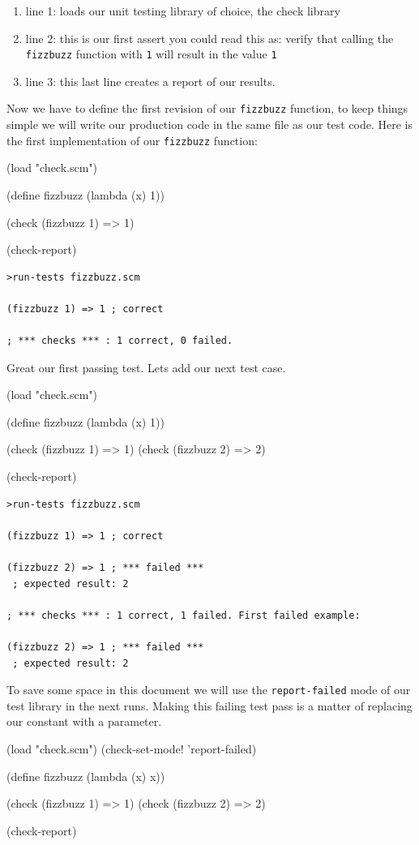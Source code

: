\documentclass[12pt,a4paper,english,twoside]{article}
\begin{document}
\begin{enumerate}
  \item line 1: loads our unit testing library of choice, the check library
  \item line 2: this is our first assert you could read this as: verify that calling 
    the \texttt{fizzbuzz} function with \texttt{1} will result in the value 
    \texttt{1}
 \item line 3: this last line creates a report of our results.
\end{enumerate}
Now we have to define the first revision of our \texttt{fizzbuzz} function, 
to keep things simple we will write our production code in the same file as 
our test code. Here is the first implementation of our \texttt{fizzbuzz} 
function:
\begin{schemecode}
(load "check.scm")

(define fizzbuzz (lambda (x) 1))

(check (fizzbuzz 1) => 1)

(check-report)
\end{schemecode}
\begin{lstlisting}
>run-tests fizzbuzz.scm

(fizzbuzz 1) => 1 ; correct

; *** checks *** : 1 correct, 0 failed.
\end{lstlisting}
Great our first passing test. Lets add our next test case.  
\begin{schemecode}
(load "check.scm")

(define fizzbuzz (lambda (x) 1))

(check (fizzbuzz 1) => 1)
(check (fizzbuzz 2) => 2)

(check-report)
\end{schemecode}
\begin{lstlisting}
>run-tests fizzbuzz.scm

(fizzbuzz 1) => 1 ; correct

(fizzbuzz 2) => 1 ; *** failed ***
 ; expected result: 2

; *** checks *** : 1 correct, 1 failed. First failed example:

(fizzbuzz 2) => 1 ; *** failed ***
 ; expected result: 2

\end{lstlisting}
To save some space in this document we will use the \texttt{report-failed} 
mode of our test library in the next runs. Making this failing test pass is a 
matter of replacing our constant with a parameter.
\begin{schemecode}
(load "check.scm")
(check-set-mode! 'report-failed)

(define fizzbuzz (lambda (x) x))

(check (fizzbuzz 1) => 1)
(check (fizzbuzz 2) => 2)

(check-report)
\end{schemecode}
\end{document}
